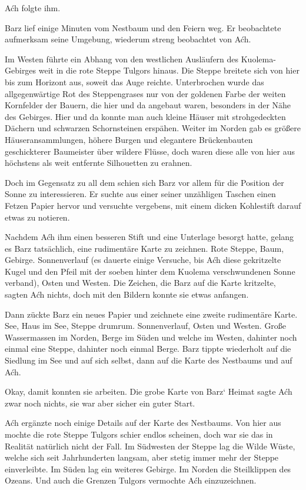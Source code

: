 Aćh folgte ihm.

Barz lief einige Minuten vom Nestbaum und den Feiern weg. Er beobachtete aufmerksam seine Umgebung, wiederum streng beobachtet von Aćh.

Im Westen führte ein Abhang von den westlichen Ausläufern des Kuolema-Gebirges weit in die rote Steppe Tulgors hinaus. Die Steppe breitete sich von hier bis zum Horizont aus, soweit das Auge reichte. Unterbrochen wurde das allgegenwärtige Rot des Steppengrases nur von der goldenen Farbe der weiten Kornfelder der Bauern, die hier und da angebaut waren, besonders in der Nähe des Gebirges. Hier und da konnte man auch kleine Häuser mit strohgedeckten Dächern und schwarzen Schornsteinen erspähen. Weiter im Norden gab es größere Häuseransammlungen, höhere Burgen und elegantere Brückenbauten geschickterer Baumeister über wildere Flüsse, doch waren diese alle von hier aus höchstens als weit entfernte Silhouetten zu erahnen.

Doch im Gegensatz zu all dem schien sich Barz vor allem für die Position der Sonne zu interessieren. Er suchte aus einer seiner unzähligen Taschen einen Fetzen Papier hervor und versuchte vergebens, mit einem dicken Kohlestift darauf etwas zu notieren.

Nachdem Aćh ihm einen besseren Stift und eine Unterlage besorgt hatte, gelang es Barz tatsächlich, eine rudimentäre Karte zu zeichnen. Rote Steppe, Baum, Gebirge. Sonnenverlauf (es dauerte einige Versuche, bis Aćh diese gekritzelte Kugel und den Pfeil mit der soeben hinter dem Kuolema verschwundenen Sonne verband), Osten und Westen. Die Zeichen, die Barz auf die Karte kritzelte, sagten Aćh nichts, doch mit den Bildern konnte sie etwas anfangen.

Dann zückte Barz ein neues Papier und zeichnete eine zweite rudimentäre Karte. See, Haus im See, Steppe drumrum. Sonnenverlauf, Osten und Westen. Große Wassermassen im Norden, Berge im Süden und welche im Westen, dahinter noch einmal eine Steppe, dahinter noch einmal Berge. Barz tippte wiederholt auf die Siedlung im See und auf sich selbst, dann auf die Karte des Nestbaums und auf Aćh.

Okay, damit konnten sie arbeiten. Die grobe Karte von Barz‘ Heimat sagte Aćh zwar noch nichts, sie war aber sicher ein guter Start.

Aćh ergänzte noch einige Details auf der Karte des Nestbaums. Von hier aus mochte die rote Steppe Tulgors schier endlos scheinen, doch war sie das in Realität natürlich nicht der Fall. Im Südwesten der Steppe lag die Wilde Wüste, welche sich seit Jahrhunderten langsam, aber stetig immer mehr der Steppe einverleibte. Im Süden lag ein weiteres Gebirge. Im Norden die Steilklippen des Ozeans. Und auch die Grenzen Tulgors vermochte Aćh einzuzeichnen.

